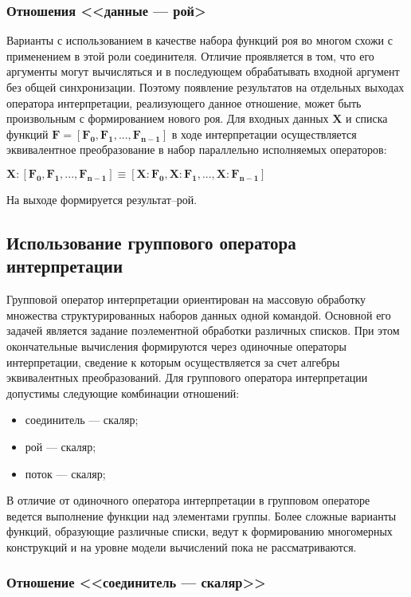 \subsubsection{Отношения <<данные --- рой>}

Варианты с использованием в качестве набора функций роя  во многом схожи с применением в этой роли соединителя. Отличие проявляется в том, что его аргументы могут вычисляться и в последующем обрабатывать входной аргумент без общей синхронизации. Поэтому появление результатов на отдельных выходах оператора интерпретации, реализующего данное отношение, может быть произвольным с формированием нового роя. Для входных данных $\mathbf{X}$ и списка функций $\mathbf{F=[F_0,F_1,..., F_{n-1}]}$ в ходе интерпретации осуществляется эквивалентное преобразование в набор параллельно исполняемых операторов:
\begin{center}
	$\mathbf{X:[F_0,F_1,..., F_{n-1}] \equiv [X:F_0,X:F_1,..., X:F_{n-1}]}$
\end{center}
На выходе формируется результат--рой.

\subsection{Использование группового оператора интерпретации}

Групповой оператор интерпретации ориентирован на массовую обработку множества структурированных наборов данных одной командой. Основной его задачей является задание поэлементной обработки различных списков. При этом окончательные вычисления формируются через одиночные операторы интерпретации, сведение к которым осуществляется за счет алгебры эквивалентных преобразований. Для группового оператора интерпретации допустимы следующие комбинации отношений:
\begin{itemize}
	\item соединитель --- скаляр;
	\item рой --- скаляр;
	\item поток --- скаляр;
\end{itemize}
В отличие от одиночного оператора интерпретации в групповом операторе ведется выполнение функции над элементами группы. Более сложные варианты функций, образующие различные списки, ведут к формированию многомерных конструкций и на уровне модели вычислений пока не рассматриваются.

\subsubsection{Отношение <<соединитель --- скаляр>>}

